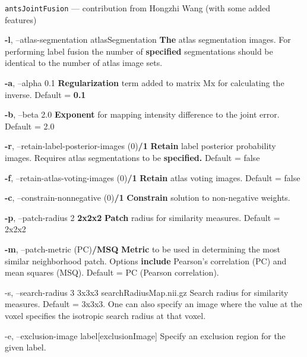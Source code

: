 \documentclass[ignorenonframetext,]{beamer}
\newenvironment{Shaded}{\begin{snugshade}}{\end{snugshade}}
\newcommand{\KeywordTok}[1]{\textcolor[rgb]{0.13,0.29,0.53}{\textbf{{#1}}}}
\newcommand{\StringTok}[1]{\textcolor[rgb]{0.31,0.60,0.02}{{#1}}}
\newcommand{\NormalTok}[1]{{#1}}
\begin{document}
\begin{frame}[fragile]{\texttt{antsJointFusion} --- contribution from
Hongzhi Wang (with some added features)}
\begin{Shaded}
\begin{Highlighting}[]
     \KeywordTok{-l}\NormalTok{, --atlas-segmentation atlasSegmentation}
          \KeywordTok{The} \NormalTok{atlas segmentation images. For performing label fusion the number of}
          \KeywordTok{specified} \NormalTok{segmentations should be identical to the number of atlas image sets.}

     \KeywordTok{-a}\NormalTok{, --alpha 0.1}
          \KeywordTok{Regularization} \NormalTok{term added to matrix Mx for calculating the inverse. Default =}
          \KeywordTok{0.1}

     \KeywordTok{-b}\NormalTok{, --beta 2.0}
          \KeywordTok{Exponent} \NormalTok{for mapping intensity difference to the joint error. Default = 2.0}

     \KeywordTok{-r}\NormalTok{, --retain-label-posterior-images (0)}\KeywordTok{/1}
          \KeywordTok{Retain} \NormalTok{label posterior probability images. Requires atlas segmentations to be}
          \KeywordTok{specified.} \NormalTok{Default = false}

     \KeywordTok{-f}\NormalTok{, --retain-atlas-voting-images (0)}\KeywordTok{/1}
          \KeywordTok{Retain} \NormalTok{atlas voting images. Default = false}

     \KeywordTok{-c}\NormalTok{, --constrain-nonnegative (0)}\KeywordTok{/1}
          \KeywordTok{Constrain} \NormalTok{solution to non-negative weights.}

     \KeywordTok{-p}\NormalTok{, --patch-radius 2}
                        \KeywordTok{2x2x2}
          \KeywordTok{Patch} \NormalTok{radius for similarity measures. Default = 2x2x2}

     \KeywordTok{-m}\NormalTok{, --patch-metric (PC)}\KeywordTok{/MSQ}
          \KeywordTok{Metric} \NormalTok{to be used in determining the most similar neighborhood patch. Options}
          \KeywordTok{include} \NormalTok{Pearson}\StringTok{'s correlation (PC) and mean squares (MSQ). Default = PC (Pearson}
\StringTok{          correlation).}

\StringTok{     -s, --search-radius 3}
\StringTok{                         3x3x3}
\StringTok{                         searchRadiusMap.nii.gz}
\StringTok{          Search radius for similarity measures. Default = 3x3x3. One can also specify an}
\StringTok{          image where the value at the voxel specifies the isotropic search radius at that}
\StringTok{          voxel.}

\StringTok{     -e, --exclusion-image label[exclusionImage]}
\StringTok{          Specify an exclusion region for the given label.}


\end{Highlighting}
\end{Shaded}
\end{frame}
\end{document}
